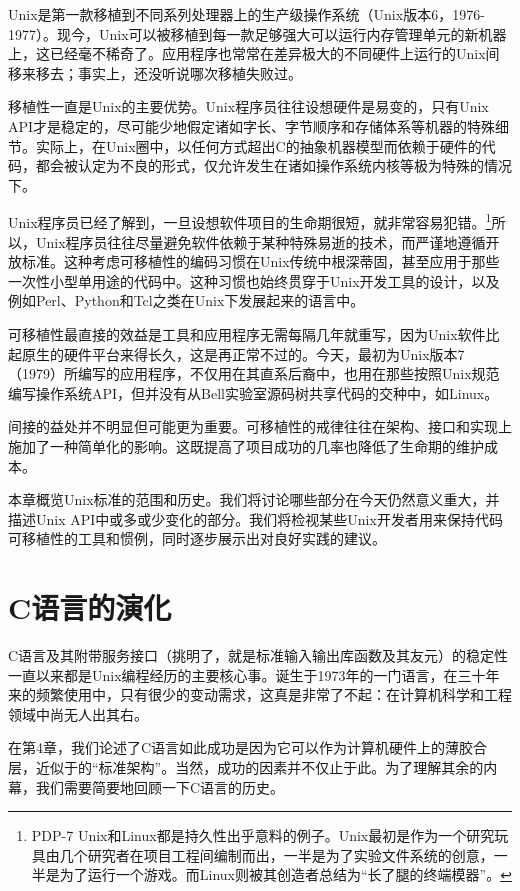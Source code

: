 \documentclass[12pt,oneside]{book}
\begin{document}
Unix是第一款移植到不同系列处理器上的生产级操作系统（Unix版本6，1976-1977）。现今，Unix可以被移植到每一款足够强大可以运行内存管理单元的新机器上，这已经毫不稀奇了。应用程序也常常在差异极大的不同硬件上运行的Unix间移来移去；事实上，还没听说哪次移植失败过。

移植性一直是Unix的主要优势。Unix程序员往往设想硬件是易变的，只有Unix API才是稳定的，尽可能少地假定诸如字长、字节顺序和存储体系等机器的特殊细节。实际上，在Unix圈中，以任何方式超出C的抽象机器模型而依赖于硬件的代码，都会被认定为不良的形式，仅允许发生在诸如操作系统内核等极为特殊的情况下。

Unix程序员已经了解到，一旦设想软件项目的生命期很短，就非常容易犯错。\footnote{PDP-7 Unix和Linux都是持久性出乎意料的例子。Unix最初是作为一个研究玩具由几个研究者在项目工程间编制而出，一半是为了实验文件系统的创意，一半是为了运行一个游戏。而Linux则被其创造者总结为“长了腿的终端模器”\cite{Torvalds}。}所以，Unix程序员往往尽量避免软件依赖于某种特殊易逝的技术，而严谨地遵循开放标准。这种考虑可移植性的编码习惯在Unix传统中根深蒂固，甚至应用于那些一次性小型单用途的代码中。这种习惯也始终贯穿于Unix开发工具的设计，以及例如Perl、Python和Tcl之类在Unix下发展起来的语言中。

可移植性最直接的效益是工具和应用程序无需每隔几年就重写，因为Unix软件比起原生的硬件平台来得长久，这是再正常不过的。今天，最初为Unix版本7（1979）所编写的应用程序，不仅用在其直系后裔中，也用在那些按照Unix规范编写操作系统API，但并没有从Bell实验室源码树共享代码的交种中，如Linux。

间接的益处并不明显但可能更为重要。可移植性的戒律往往在架构、接口和实现上施加了一种简单化的影响。这既提高了项目成功的几率也降低了生命期的维护成本。

本章概览Unix标准的范围和历史。我们将讨论哪些部分在今天仍然意义重大，并描述Unix API中或多或少变化的部分。我们将检视某些Unix开发者用来保持代码可移植性的工具和惯例，同时逐步展示出对良好实践的建议。

\section{C语言的演化}
C语言及其附带服务接口（挑明了，就是标准输入输出库函数及其友元）的稳定性一直以来都是Unix编程经历的主要核心事。诞生于1973年的一门语言，在三十年来的频繁使用中，只有很少的变动需求，这真是非常了不起：在计算机科学和工程领域中尚无人出其右。

在第4章，我们论述了C语言如此成功是因为它可以作为计算机硬件上的薄胶合层，近似于\cite{BlaauwBrooks}的“标准架构”。当然，成功的因素并不仅止于此。为了理解其余的内幕，我们需要简要地回顾一下C语言的历史。
\end{document}
